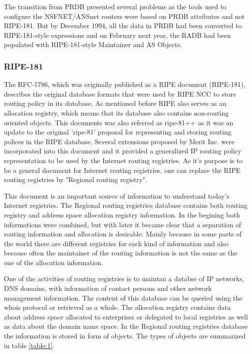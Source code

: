 \documentclass[11pt,a4paper]{scrreprt}
\begin{document}
The transition from PRDB presented several problems as the tools used to configure the NSFNET/ANSnet routers were based on PRDB attributes and not RIPE-181. But by December 1994, all the data in PRDB had been converted to RIPE-181-style expressions and on February next year, the RADB had been populated with RIPE-181-style Maintainer and AS Objects. 

\subsubsection{RIPE-181}

The RFC-1786, which was originally published as a RIPE document (RIPE-181), describes the original database formats that were used by RIPE NCC to store routing policy in its database. As mentioned before RIPE also serves as an allocation registry, which means that its database also contains non-routing oriented objects. 
This documents was also referred as ripe-81++ as it was an update to the original 'ripe-81' proposal for representing and storing routing polices in the RIPE database. Several extensions proposed by Merit Inc. were incorporated into this document and it provided a generalized IP routing policy representation to be used by the Internet routing registries. As it's purpose is to be a general document for Internet routing registries, one can replace the RIPE routing registries by "Regional routing registry".

This document is an important source of information to understand today's Internet registries. 
The Regional routing registries database contains both routing registry and address space allocation registry information. In the begining both informations were combined, but with later it became clear that a separation
of routing information and allocation is desirable. Mainly because in some parts of the world there are different registries for each kind of information and also because often the maintainer of the routing information is not the same as the one of the allocation information.

One of the activities of routing registries is to maintan a databse of IP networks, DNS domains, with information of contact persons and other network management information. The content of this database can be queried using the whois protocol or retrieved as a whole.
The allocation registry contains data about address space allocated to enterprises or delegated to local registries as well as data about the domain name space. 
In the Regional routing registries database the information is stored in form of objects. The types of objects are summarized in table \ref{table:1}.   
   
\end{document}
